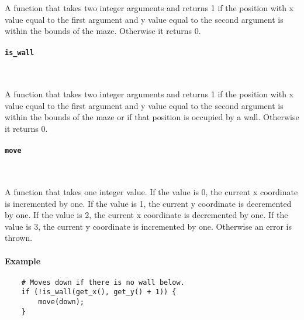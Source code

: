 A function that takes two integer arguments and returns 1 if the position with x value equal to the first argument and y value equal to the second argument is within the bounds of the maze. Otherwise it returns 0.

\paragraph{\texttt{is\_wall}} \

A function that takes two integer arguments and returns 1 if the position with x value equal to the first argument and y value equal to the second argument is within the bounds of the maze or if that position is occupied by a wall. Otherwise it returns 0.

\paragraph{\texttt{move}} \

A function that takes one integer value. If the value is 0, the current x coordinate is incremented by one. If the value is 1, the current y coordinate is decremented by one. If the value is 2, the current x coordinate is decremented by one. If the value is 3, the current y coordinate is incremented by one. Otherwise an error is thrown.

\paragraph{Example}

\begin{verbatim}
    # Moves down if there is no wall below.
    if (!is_wall(get_x(), get_y() + 1)) {
        move(down);
    }
\end{verbatim}
